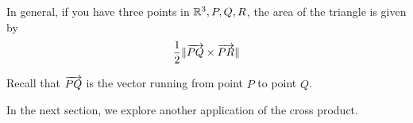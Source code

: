 In general, if you have three points in $\mathbb{R}^{3}, P,Q,R$, the area of the triangle is given by
\begin{equation*}
\frac{1}{2}\|  \overrightarrow{PQ} \times  \overrightarrow{PR}  \| 
\end{equation*}

Recall that $\overrightarrow{PQ}$ is the vector running from point $P$ to point $Q$. 

\begin{center}
\end{center}

In the next section, we explore another application of the cross product.